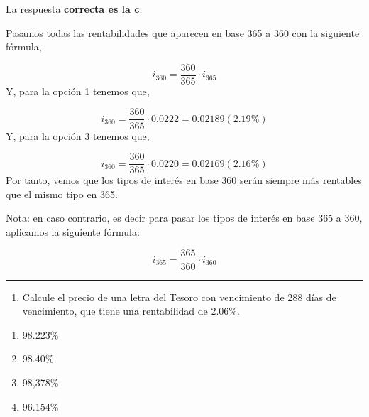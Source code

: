 \documentclass[
  letterpaper,
  DIV=11,
  numbers=noendperiod]{scrreprt}
\providecommand{\tightlist}{%
  \setlength{\itemsep}{0pt}\setlength{\parskip}{0pt}}\usepackage{longtable,booktabs,array}
\begin{document}
\begin{tcolorbox}[enhanced jigsaw, left=2mm, opacityback=0, colback=white, breakable, arc=.35mm, bottomrule=.15mm, rightrule=.15mm, toprule=.15mm, leftrule=.75mm, colframe=quarto-callout-tip-color-frame]
\begin{minipage}[t]{5.5mm}
\textcolor{quarto-callout-tip-color}{\faLightbulb}
\end{minipage}%
\begin{minipage}[t]{\textwidth - 5.5mm}

La respuesta \textbf{correcta es la c}.

Pasamos todas las rentabilidades que aparecen en base 365 a 360 con la
siguiente fórmula,

\[i_{360}=\frac{360 }{365 }\cdot i_{365}\] Y, para la opción 1 tenemos
que,

\[i_{360}=\frac{360 }{365 }\cdot 0.0222=0.02189(2.19\%)\] Y, para la
opción 3 tenemos que,

\[i_{360}=\frac{360 }{365 }\cdot 0.0220=0.02169(2.16\%)\] Por tanto,
vemos que los tipos de interés en base 360 serán siempre más rentables
que el mismo tipo en 365.

Nota: en caso contrario, es decir para pasar los tipos de interés en
base 365 a 360, aplicamos la siguiente fórmula:

\[i_{365}=\frac{365 }{360 }\cdot i_{360}\]

\end{minipage}%
\end{tcolorbox}

\begin{center}\rule{0.5\linewidth}{0.5pt}\end{center}

\begin{enumerate}
\def\labelenumi{\arabic{enumi}.}
\setcounter{enumi}{94}
\tightlist
\item
  Calcule el precio de una letra del Tesoro con vencimiento de 288 días
  de vencimiento, que tiene una rentabilidad de 2.06\%.
\end{enumerate}

\begin{enumerate}
\def\labelenumi{\alph{enumi})}
\item
  98.223\%
\item
  98.40\%
\item
  98,378\%
\item
  96.154\%
\end{enumerate}
\end{document}
